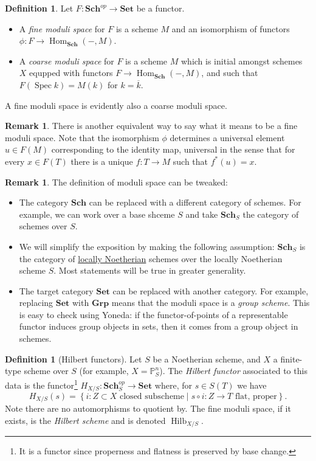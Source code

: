 \documentclass[10pt]{article}
\theoremstyle{definition}
\newtheorem{defn}[thm]{Definition}
\newtheorem{rmk}[thm]{Remark}
\DeclareMathOperator{\Hom}{Hom}
\DeclareMathOperator{\Spec}{Spec}
\DeclareMathOperator{\Hilb}{Hilb}
\newcommand{\cat}{\mathbf}
\begin{document}
\begin{defn}
Let $F: \cat{Sch}^{op} \rightarrow \cat{Set}$ be a functor.
\begin{itemize}
\item A \emph{fine moduli space} for $F$ is a scheme $M$ and an isomorphism of functors $\phi: F \rightarrow \Hom_{\cat{Sch}}(-, M)$.  
\item A \emph{coarse moduli space} for $F$ is a scheme $M$ which is initial amongst schemes $X$ equpped with functors $F \rightarrow \Hom_{\cat{Sch}}(-, M)$, and such that $F(\Spec k) = M(k)$ for $k = \overline{k}$.
\end{itemize}
A fine moduli space is evidently also a coarse moduli space.
\end{defn}


\begin{rmk}
There is another equivalent way to say what it means to be a fine moduli space.  Note that the isomorphism $\phi$ determines a universal element $u \in F(M)$ corresponding to the identity map, universal in the sense that for every $x \in F(T)$ there is a unique $f: T \rightarrow M$ such that $f^*(u) = x$.
\end{rmk}

\begin{rmk}
The definition of moduli space can be tweaked:
\begin{itemize}
\item The category $\cat{Sch}$ can be replaced with a different category of schemes.  For example, we can work over a base shceme $S$ and take $\cat{Sch}_S$ the category of schemes over $S$.
\item We will simplify the exposition by making the following assumption: $\cat{Sch}_S$ is the category of \underline{locally Noetherian} schemes over the locally Noetherian scheme $S$.  Most statements will be true in greater generality.
\item The target category $\cat{Set}$ can be replaced with another category.  For example, replacing $\cat{Set}$ with $\cat{Grp}$ means that the moduli space is a \emph{group scheme}.  This is easy to check using Yoneda: if the functor-of-points of a representable functor induces group objects in sets, then it comes from a group object in schemes.
\end{itemize}
\end{rmk}

\begin{defn}[Hilbert functors]
Let $S$ be a Noetherian scheme, and $X$ a finite-type scheme over $S$ (for example, $X = \mathbb{P}^n_S$).  The \emph{Hilbert functor} associated to this data is the functor\footnote{It is a functor since properness and flatness is preserved by base change.} $H_{X/S}: \cat{Sch}_S^{op} \rightarrow \cat{Set}$ where, for $s \in S(T)$ we have
$$H_{X/S}(s) = \left\{i: Z \subset X \text{ closed subscheme} \mid s \circ i: Z \rightarrow T \text{ flat, proper} \right\}.$$
Note there are no automorphisms to quotient by.  The fine moduli space, if it exists, is the \emph{Hilbert scheme} and is denoted $\Hilb_{X/S}$.
\end{defn}
\end{document}
